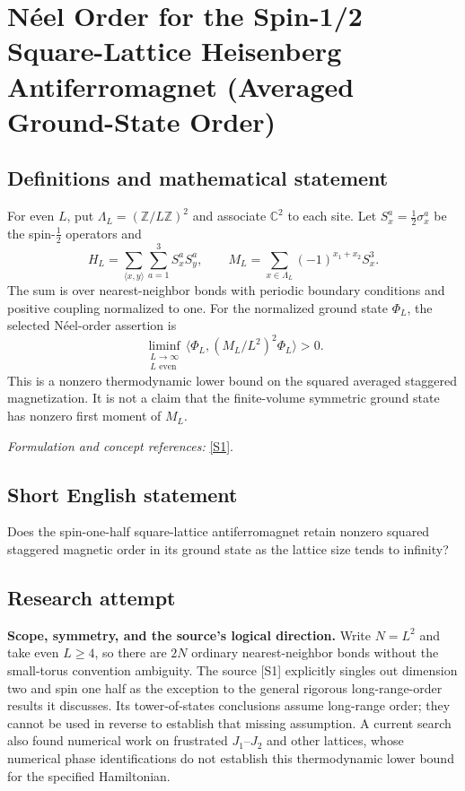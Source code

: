 \documentclass[11pt]{article}
\begin{document}
\section*{\texorpdfstring{Néel Order for the Spin-1/2 Square-Lattice Heisenberg Antiferromagnet (Averaged Ground-State Order)}{Néel Order for the Spin-1/2 Square-Lattice Heisenberg Antiferromagnet (Averaged Ground-State Order)}}\label{statement}
\subsection{Definitions and mathematical statement}
For even $L$, put $\Lambda_L=({\mathbb{Z}}/L{\mathbb{Z}})^2$ and associate ${\mathbb{C}}^2$ to each site. Let $S_x^a=\frac12\sigma_x^a$ be the spin-$\frac12$ operators and
\[
 H_L=\sum_{\langle x,y\rangle}\sum_{a=1}^3S_x^aS_y^a,
 \qquad M_L=\sum_{x\in\Lambda_L}(-1)^{x_1+x_2}S_x^3.
\]
The sum is over nearest-neighbor bonds with periodic boundary conditions and positive coupling normalized to one. For the normalized ground state $\Phi_L$, the selected N\'eel-order assertion is
\[
 \liminf_{\substack{L\to\infty\\L\text{ even}}}
 \langle\Phi_L,(M_L/L^2)^2\Phi_L\rangle>0.
\]
This is a nonzero thermodynamic lower bound on the squared averaged staggered magnetization. It is not a claim that the finite-volume symmetric ground state has nonzero first moment of $M_L$.
\par\smallskip\textit{Formulation and concept references:} \href{https://arxiv.org/pdf/1807.05847}{[S1]}.

\subsection{Short English statement}
Does the spin-one-half square-lattice antiferromagnet retain nonzero squared staggered magnetic order in its ground state as the lattice size tends to infinity?
\subsection{Research attempt}
\textbf{Scope, symmetry, and the source's logical direction.}
Write $N=L^2$ and take even $L\geq4$, so there are $2N$ ordinary
nearest-neighbor bonds without the small-torus convention ambiguity.
The source [S1] explicitly singles out dimension two and spin one half as the
exception to the general rigorous long-range-order results it discusses.
Its tower-of-states conclusions assume long-range order; they cannot be used
in reverse to establish that missing assumption.  A current search also found
numerical work on frustrated $J_1$--$J_2$ and other lattices, whose numerical
phase identifications do not establish this thermodynamic lower bound for the
specified Hamiltonian.
\end{document}
